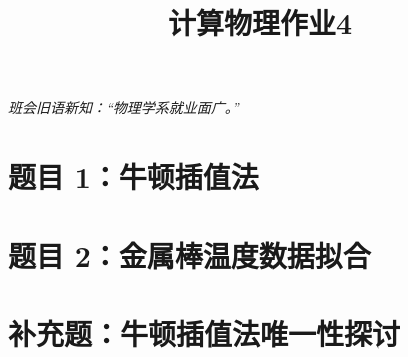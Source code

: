 \documentclass[11pt]{article}
\author{
    \makebox[0.8\textwidth]{%
        \centering
        杨远青 \quad 22300190015 \quad
        \href{https://github.com/bud-primordium/Computational-Physics-Fall-2024}{\raisebox{-2pt}{\texttt{[image: ../../.utils/comphys.pdf]}}}
    }
}
\title{计算物理作业4}
\begin{document}
\maketitle
\textit{班会旧语新知：“物理学系就业面广。”}
\section{题目 1：牛顿插值法}


\section{题目 2：金属棒温度数据拟合}


\section{补充题：牛顿插值法唯一性探讨}


\vspace{5pt}
\end{document}
